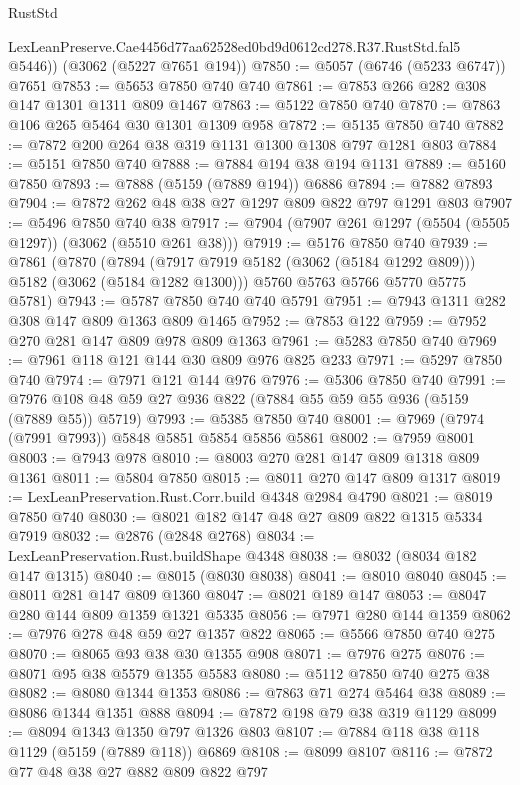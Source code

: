 \begin{lexlean}{RustStd}
\begin{coremodule}
        LexLeanPreserve.Cae4456d77aa62528ed0bd9d0612cd278.R37.RustStd.fal5
        @5446))
    (@3062 (@5227 @7651 @194))
@7850 := @5057 (@6746 (@5233 @6747)) @7651
@7853 := @5653 @7850 @740 @740
@7861 := @7853 @266 @282 @308 @147 @1301 @1311 @809 @1467
@7863 := @5122 @7850 @740
@7870 := @7863 @106 @265 @5464 @30 @1301 @1309 @958
@7872 := @5135 @7850 @740
@7882 := @7872 @200 @264 @38 @319 @1131 @1300 @1308 @797 @1281 @803
@7884 := @5151 @7850 @740
@7888 := @7884 @194 @38 @194 @1131
@7889 := @5160 @7850
@7893 := @7888 (@5159 (@7889 @194)) @6886
@7894 := @7882 @7893
@7904 := @7872 @262 @48 @38 @27 @1297 @809 @822 @797 @1291 @803
@7907 := @5496 @7850 @740 @38
@7917 := @7904 (@7907 @261 @1297 (@5504 (@5505 @1297)) (@3062 (@5510 @261 @38)))
@7919 := @5176 @7850 @740
@7939 := @7861
    (@7870
      (@7894 (@7917 @7919 @5182 (@3062 (@5184 @1292 @809))) @5182 (@3062 (@5184 @1282 @1300)))
      @5760
      @5763
      @5766
      @5770
      @5775
      @5781)
@7943 := @5787 @7850 @740 @740 @5791
@7951 := @7943 @1311 @282 @308 @147 @809 @1363 @809 @1465
@7952 := @7853 @122
@7959 := @7952 @270 @281 @147 @809 @978 @809 @1363
@7961 := @5283 @7850 @740
@7969 := @7961 @118 @121 @144 @30 @809 @976 @825 @233
@7971 := @5297 @7850 @740
@7974 := @7971 @121 @144 @976
@7976 := @5306 @7850 @740
@7991 := @7976 @108 @48 @59 @27 @936 @822 (@7884 @55 @59 @55 @936 (@5159 (@7889 @55)) @5719)
@7993 := @5385 @7850 @740
@8001 := @7969 (@7974 (@7991 @7993)) @5848 @5851 @5854 @5856 @5861
@8002 := @7959 @8001
@8003 := @7943 @978
@8010 := @8003 @270 @281 @147 @809 @1318 @809 @1361
@8011 := @5804 @7850
@8015 := @8011 @270 @147 @809 @1317
@8019 := LexLeanPreservation.Rust.Corr.build @4348 @2984 @4790
@8021 := @8019 @7850 @740
@8030 := @8021 @182 @147 @48 @27 @809 @822 @1315 @5334 @7919
@8032 := @2876 (@2848 @2768)
@8034 := LexLeanPreservation.Rust.buildShape @4348
@8038 := @8032 (@8034 @182 @147 @1315)
@8040 := @8015 (@8030 @8038)
@8041 := @8010 @8040
@8045 := @8011 @281 @147 @809 @1360
@8047 := @8021 @189 @147
@8053 := @8047 @280 @144 @809 @1359 @1321 @5335
@8056 := @7971 @280 @144 @1359
@8062 := @7976 @278 @48 @59 @27 @1357 @822
@8065 := @5566 @7850 @740 @275
@8070 := @8065 @93 @38 @30 @1355 @908
@8071 := @7976 @275
@8076 := @8071 @95 @38 @5579 @1355 @5583
@8080 := @5112 @7850 @740 @275 @38
@8082 := @8080 @1344 @1353
@8086 := @7863 @71 @274 @5464 @38
@8089 := @8086 @1344 @1351 @888
@8094 := @7872 @198 @79 @38 @319 @1129
@8099 := @8094 @1343 @1350 @797 @1326 @803
@8107 := @7884 @118 @38 @118 @1129 (@5159 (@7889 @118)) @6869
@8108 := @8099 @8107
@8116 := @7872 @77 @48 @38 @27 @882 @809 @822 @797

\end{coremodule}
\end{lexlean}

